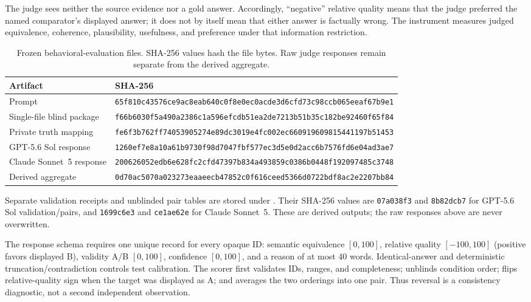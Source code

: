 \documentclass[11pt]{article}
\begin{document}
The judge sees neither the source evidence nor a gold answer. Accordingly, ``negative'' relative
quality means that the judge preferred the named comparator's displayed answer; it does not by
itself mean that either answer is factually wrong. The instrument measures judged equivalence,
coherence, plausibility, usefulness, and preference under that information restriction.

\begin{table}[H]
\centering
\scriptsize
\caption{Frozen behavioral-evaluation files. SHA-256 values hash the file bytes. Raw judge
responses remain separate from the derived aggregate.}
\label{tab:behavioral-hashes}
\begin{tabular}{ll}
\toprule
Artifact & SHA-256 \\
\midrule
Prompt & \texttt{65f810c43576ce9ac8eab640c0f8e0ec0acde3d6cfd73c98ccb065eeaf67b9e1} \\
Single-file blind package & \texttt{f66b6030f5a490a2386c1a596efcdb51ea2de7213b51b35c182be92460f65f84} \\
Private truth mapping & \texttt{fe6f3b762ff74053905274e89dc3019e4fc002ec660919609815441197b51453} \\
GPT-5.6 Sol response & \texttt{1260ef7e8a10a61b9730f98d7047fbf577ec3d5e0d2acc6b7576fd6e04ad3ae7} \\
Claude Sonnet~5 response & \texttt{200626052edb6e628fc2cfd47397b834a493859c0386b0448f192097485c3748} \\
Derived aggregate & \texttt{0d70ac5070a023273eaaeecb47852c0f616ceed5366d0722bdf8ac2e2207bb84} \\
\bottomrule
\end{tabular}
\end{table}

Separate validation receipts and unblinded pair tables are stored under
. Their SHA-256 values are
\texttt{07a038f3} and \texttt{8b82dcb7} for GPT-5.6 Sol validation/pairs, and
\texttt{1699c6e3} and \texttt{ce1ae62e} for Claude Sonnet~5. These are derived outputs; the raw
responses above are never overwritten.

The response schema requires one unique record for every opaque ID: semantic equivalence
$[0,100]$, relative quality $[-100,100]$ (positive favors displayed B), validity A/B $[0,100]$,
confidence $[0,100]$, and a reason of at most 40 words. Identical-answer and deterministic
truncation/contradiction controls test calibration. The scorer first validates IDs, ranges, and
completeness; unblinds condition order; flips relative-quality sign when the target was displayed
as A; and averages the two orderings into one pair. Thus reversal is a consistency diagnostic,
not a second independent observation.
\end{document}
